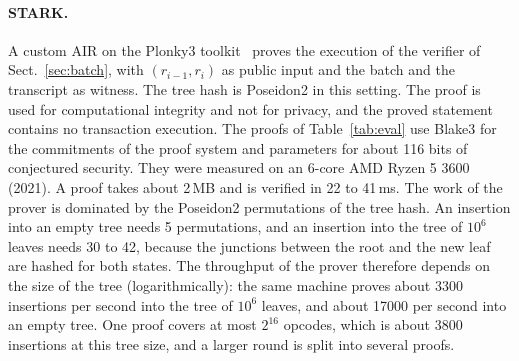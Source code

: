 \documentclass[runningheads]{llncs}
\begin{document}
\paragraph{STARK.}
A custom AIR on the Plonky3 toolkit~\cite{plonky3,rsmtair} proves the execution of the verifier of Sect.~\ref{sec:batch}, with $(r_{i-1}, r_i)$ as public input and the batch and the transcript as witness. The tree hash is Poseidon2 in this setting. The proof is used for computational integrity and not for privacy, and the proved statement contains no transaction execution. The proofs of Table~\ref{tab:eval} use Blake3 for the commitments of the proof system and parameters for about 116 bits of conjectured security. They were measured on an 6-core AMD Ryzen 5 3600 (2021). A proof takes about 2\,MB and is verified in 22 to 41\,ms. The work of the prover is dominated by the Poseidon2 permutations of the tree hash. An insertion into an empty tree needs 5 permutations, and an insertion into the tree of $10^6$ leaves needs 30 to 42, because the junctions between the root and the new leaf are hashed for both states. The throughput of the prover therefore depends on the size of the tree (logarithmically): the same machine proves about 3300 insertions per second into the tree of $10^6$ leaves, and about 17000 per second into an empty tree.
One proof covers at most $2^{16}$ opcodes, which is about 3800 insertions at this tree size, and a larger round is split into several proofs.
\end{document}
